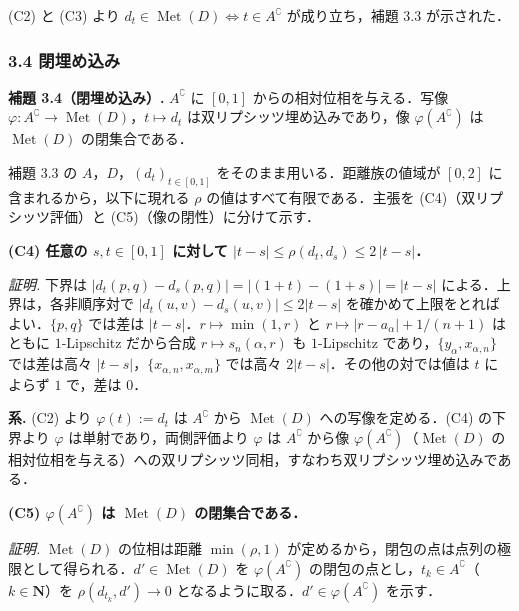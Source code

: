 \documentclass[
  lualatex,ja=standard]{bxjsarticle}
\begin{document}
(C2) と (C3) より
\(d_t \in \operatorname{Met}(D) \iff t \in A^\complement\)
が成り立ち，補題 3.3 が示された．

\hypertarget{ux9589ux57cbux3081ux8fbcux307f}{%
\subsubsection{3.4 閉埋め込み}\label{ux9589ux57cbux3081ux8fbcux307f}}

\textbf{補題 3.4（閉埋め込み）.} \(A^\complement\) に \([0,1]\)
からの相対位相を与える．写像
\(\varphi : A^\complement \to \operatorname{Met}(D)\)，\(t \mapsto d_t\)
は双リプシッツ埋め込みであり，像 \(\varphi(A^\complement)\) は
\(\operatorname{Met}(D)\) の閉集合である．

補題 3.3 の \(A\)，\(D\)，\((d_t)_{t \in [0,1]}\)
をそのまま用いる．距離族の値域が \([0,2]\) に含まれるから，以下に現れる
\(\rho\) の値はすべて有限である．主張を (C4)（双リプシッツ評価）と
(C5)（像の閉性）に分けて示す．

\textbf{(C4) 任意の \(s, t \in [0,1]\) に対して
\(\lvert t - s\rvert \le \rho(d_t, d_s) \le 2\,\lvert t - s\rvert\)．}

\emph{証明.} 下界は
\(\lvert d_t(p,q) - d_s(p,q)\rvert = \lvert(1+t)-(1+s)\rvert = \lvert t-s\rvert\)
による．上界は，各非順序対で
\(\lvert d_t(u,v) - d_s(u,v)\rvert \le 2\lvert t-s\rvert\)
を確かめて上限をとればよい．\(\{p,q\}\) では差は
\(\lvert t-s\rvert\)．\(r \mapsto \min(1,r)\) と
\(r \mapsto \lvert r - a_\alpha\rvert + 1/(n+1)\) はともに
\(1\)-Lipschitz だから合成 \(r \mapsto s_n(\alpha,r)\) も
\(1\)-Lipschitz であり，\(\{y_\alpha, x_{\alpha,n}\}\) では差は高々
\(\lvert t-s\rvert\)，\(\{x_{\alpha,n}, x_{\alpha,m}\}\) では高々
\(2\lvert t-s\rvert\)．その他の対では値は \(t\) によらず \(1\) で，差は
\(0\)．

\textbf{系.} (C2) より \(\varphi(t) := d_t\) は \(A^\complement\) から
\(\operatorname{Met}(D)\) への写像を定める．(C4) の下界より \(\varphi\)
は単射であり，両側評価より \(\varphi\) は \(A^\complement\) から像
\(\varphi(A^\complement)\)（\(\operatorname{Met}(D)\)
の相対位相を与える）への双リプシッツ同相，すなわち双リプシッツ埋め込みである．

\textbf{(C5) \(\varphi(A^\complement)\) は \(\operatorname{Met}(D)\)
の閉集合である．}

\emph{証明.} \(\operatorname{Met}(D)\) の位相は距離 \(\min(\rho,1)\)
が定めるから，閉包の点は点列の極限として得られる．\(d' \in \operatorname{Met}(D)\)
を \(\varphi(A^\complement)\)
の閉包の点とし，\(t_k \in A^\complement\)（\(k \in \mathbf{N}\)）を
\(\rho(d_{t_k}, d') \to 0\)
となるように取る．\(d' \in \varphi(A^\complement)\) を示す．
\end{document}
